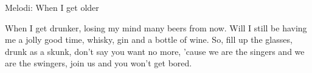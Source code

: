 \begin{song}

\begin{songmeta}
Melodi: When I get older
\end{songmeta}

\begin{songtext}
When I get drunker, losing my mind
many beers from now.
Will I still be having me a jolly good time,
whisky, gin and a bottle of wine.
So, fill up the glasses, drunk as a skunk,
don't say you want no more,
'cause we are the singers
and we are the swingers,
join us and you won't get bored.
\end{songtext}

\end{song}
